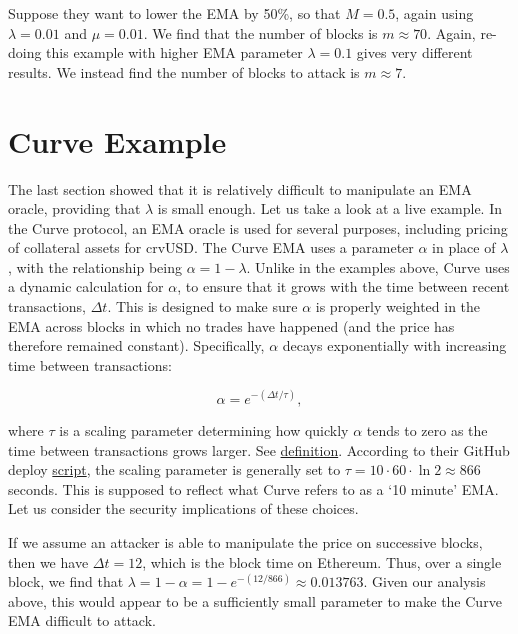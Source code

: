 \documentclass[bibliography=numbered]{article}
\begin{document}
Suppose they want to lower the EMA by 50\%, so that $M = 0.5$, again using $\lambda = 0.01$ and $\mu = 0.01$. We find that the number of blocks is $m \approx 70$. Again, re-doing this example with higher EMA parameter $\lambda = 0.1$ gives very different results. We instead find the number of blocks to attack is $m \approx 7$. 

\section{Curve Example}

The last section showed that it is relatively difficult to manipulate an EMA oracle, providing that $\lambda$ is small enough. Let us take a look at a live example. In the Curve protocol, an EMA oracle is used for several purposes, including pricing of collateral assets for crvUSD. The Curve EMA uses a parameter $\alpha$ in place of $\lambda$, with the relationship being $\alpha = 1 - \lambda$. Unlike in the examples above, Curve uses a dynamic calculation for $\alpha$, to ensure that it grows with the time between recent transactions, $\Delta t$. This is designed to make sure $\alpha$ is properly weighted in the EMA across blocks in which no trades have happened (and the price has therefore remained constant). Specifically, $\alpha$ decays exponentially with increasing time between transactions:

\begin{equation}
    \alpha
    =
    e^{-(\Delta t/\tau)},
\end{equation}

where $\tau$ is a scaling parameter determining how quickly $\alpha$ tends to zero as the time between transactions grows larger. See \href{https://github.com/curvefi/curve-stablecoin/blob/master/contracts/price_oracles/EmaPriceOracle.vy#L113}{definition}. According to their GitHub deploy \href{https://github.com/curvefi/curve-stablecoin/blob/8dc86da7887eddd90d5132b441e8d378856e3e64/scripts/ape-deploy.py#L47}{script}, the scaling parameter is generally set to $\tau = 10 \cdot 60 \cdot \ln{2} \approx 866$ seconds. This is supposed to reflect what Curve refers to as a `10 minute' EMA. Let us consider the security implications of these choices. 

If we assume an attacker is able to manipulate the price on successive blocks, then we have $\Delta t = 12$, which is the block time on Ethereum. Thus, over a single block, we find that $\lambda = 1 - \alpha = 1 - e^{-(12/866)} \approx 0.013763$. Given our analysis above, this would appear to be a sufficiently small parameter to make the Curve EMA difficult to attack. 
\end{document}
